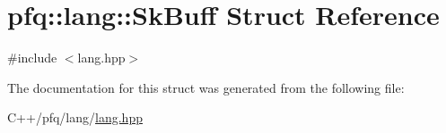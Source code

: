 \hypertarget{structpfq_1_1lang_1_1SkBuff}{}\section{pfq\+:\+:lang\+:\+:Sk\+Buff Struct Reference}
\label{structpfq_1_1lang_1_1SkBuff}


{\ttfamily \#include $<$lang.\+hpp$>$}



The documentation for this struct was generated from the following file\+:\begin{DoxyCompactItemize}
\item 
C++/pfq/lang/\hyperlink{lang_8hpp}{lang.\+hpp}\end{DoxyCompactItemize}
